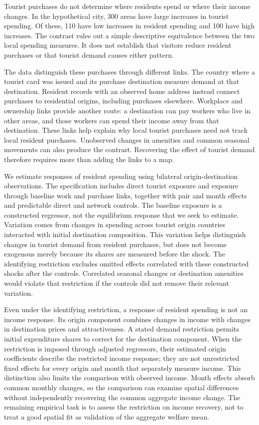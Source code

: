Tourist purchases do not determine where residents spend or where their income
changes. In the hypothetical city, 300 areas have large increases in tourist spending.
Of these, 110 have low increases in resident spending and 100 have high increases.
The contrast rules out a simple descriptive equivalence between the two local
spending measures. It does not establish that visitors reduce resident purchases
or that tourist demand causes either pattern.

The data distinguish these purchases through different links. The country where
a tourist card was issued and its purchase destination measure demand at that destination. Resident
records with an observed home address instead connect purchases to residential
origins, including purchases elsewhere. Workplace and ownership links provide
another route: a destination can pay workers who live in other areas, and those
workers can spend their income away from that destination. These links help
explain why local tourist purchases need not track local resident purchases.
Unobserved changes in amenities and common seasonal movements can also produce
the contrast. Recovering the effect of tourist demand therefore requires more
than adding the links to a map.

We estimate responses of resident spending using bilateral origin-destination
observations. The specification includes direct tourist exposure and exposure
through baseline work and purchase links, together with pair and month effects
and predictable direct and network controls. The baseline exposure is a constructed
regressor, not the equilibrium response that we seek to estimate. Variation comes
from changes in spending across tourist origin countries interacted with initial
destination composition. This variation helps distinguish changes in tourist
demand from resident purchases, but does not become exogenous merely because its
shares are measured before the shock. The identifying restriction excludes omitted
effects correlated with these constructed shocks after the controls. Correlated
seasonal changes or destination amenities would violate that restriction if the
controls did not remove their relevant variation.

Even under the identifying restriction, a response of resident spending is not an
income response. Its origin component combines changes in income with changes
in destination prices and attractiveness. A stated demand restriction permits
initial expenditure shares to correct for the destination component. When the
restriction is imposed through adjusted regressors, their estimated origin
coefficients describe the restricted income response; they are not unrestricted
fixed effects for every origin and month that separately measure income. This distinction also
limits the comparison with observed income. Month effects absorb common monthly
changes, so the comparison can examine spatial differences without independently
recovering the common aggregate income change. The remaining empirical task is
to assess the restriction on income recovery, not to treat a good spatial fit as
validation of the aggregate welfare mean.

